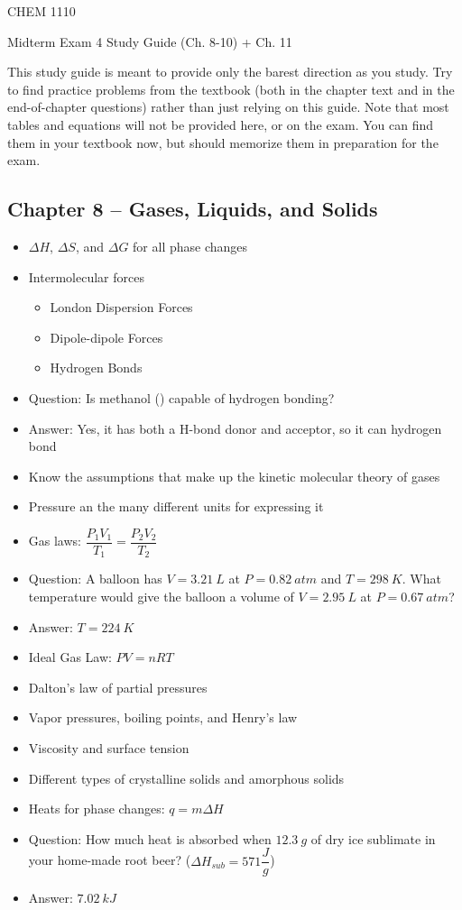 \documentclass[12pt, letterpaper]{memoir}
\begin{document}
	\mainmatter
	
	\begin{center}
		{\Huge CHEM 1110}
		
		{\LARGE Midterm Exam 4 Study Guide (Ch. 8-10) + Ch. 11}
	\end{center}
	
	This study guide is meant to provide only the barest direction as you study. Try to find practice problems from the textbook (both in the chapter text and in the end-of-chapter questions) rather than just relying on this guide. Note that most tables and equations will not be provided here, or on the exam. You can find them in your textbook now, but should memorize them in preparation for the exam.
	
	\subsection*{Chapter 8 -- Gases, Liquids, and Solids}
	\begin{itemize}
		\item $\Delta H$, $\Delta S$, and $\Delta G$ for all phase changes
		\item Intermolecular forces
		\begin{itemize}
			\item London Dispersion Forces
			\item Dipole-dipole Forces
			\item Hydrogen Bonds
		\end{itemize}
		\item Question: Is methanol () capable of hydrogen bonding?
		\item Answer: Yes, it has both a H-bond donor and acceptor, so it can hydrogen bond
		\item Know the assumptions that make up the kinetic molecular theory of gases
		\item Pressure an the many different units for expressing it
		\item Gas laws: $\dfrac{P_1V_1}{T_1}=\dfrac{P_2V_2}{T_2}$
		\item Question: A balloon has $V=3.21~L$ at $P=0.82~atm$ and $T=298~K$. What temperature would give the balloon a volume of $V=2.95~L$ at $P=0.67~atm$?
		\item Answer: $T=224~K$
		\item Ideal Gas Law: $PV=nRT$
		\item Dalton's law of partial pressures
		\item Vapor pressures, boiling points, and Henry's law
		\item Viscosity and surface tension
		\item Different types of crystalline solids and amorphous solids
		\item Heats for phase changes: $q=m\Delta H$
		\item Question: How much heat is absorbed when $12.3~g$ of dry ice sublimate in your home-made root beer? ($\Delta H_{sub} = 571\dfrac{J}{g}$)
		\item Answer: $7.02~kJ$
	\end{itemize}
	
\end{document}
